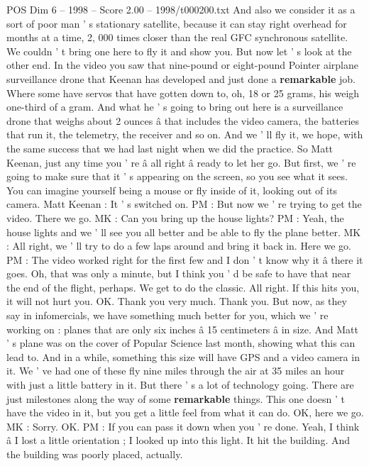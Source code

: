 \begin{textsample}{POS Dim 6 – 1998 – Score 2.00 – 1998/t000200.txt}
And also we consider it as a sort of poor man ' s stationary satellite, because it can stay right overhead for months at a time, 2, 000 times closer than the real GFC synchronous satellite.
We couldn ' t bring one here to fly it and show you.
But now let ' s look at the other end.
In the video you saw that nine-pound or eight-pound Pointer airplane surveillance drone that Keenan has developed and just done a \textbf{remarkable} job.
Where some have servos that have gotten down to, oh, 18 or 25 grams, his weigh one-third of a gram.
And what he ' s going to bring out here is a surveillance drone that weighs about 2 ounces â that includes the video camera, the batteries that run it, the telemetry, the receiver and so on.
And we ' ll fly it, we hope, with the same success that we had last night when we did the practice.
So Matt Keenan, just any time you ' re â all right â ready to let her go.
But first, we ' re going to make sure that it ' s appearing on the screen, so you see what it sees.
You can imagine yourself being a mouse or fly inside of it, looking out of its camera.
Matt Keenan : It ' s switched on.
PM : But now we ' re trying to get the video.
There we go.
MK : Can you bring up the house lights?
PM : Yeah, the house lights and we ' ll see you all better and be able to fly the plane better.
MK : All right, we ' ll try to do a few laps around and bring it back in.
Here we go.
PM : The video worked right for the first few and I don ' t know why it â there it goes.
Oh, that was only a minute, but I think you ' d be safe to have that near the end of the flight, perhaps.
We get to do the classic.
All right.
If this hits you, it will not hurt you.
OK.
Thank you very much.
Thank you.
But now, as they say in infomercials, we have something much better for you, which we ' re working on : planes that are only six inches â 15 centimeters â in size.
And Matt ' s plane was on the cover of Popular Science last month, showing what this can lead to.
And in a while, something this size will have GPS and a video camera in it.
We ' ve had one of these fly nine miles through the air at 35 miles an hour with just a little battery in it.
But there ' s a lot of technology going.
There are just milestones along the way of some \textbf{remarkable} things.
This one doesn ' t have the video in it, but you get a little feel from what it can do.
OK, here we go.
MK : Sorry.
OK.
PM : If you can pass it down when you ' re done.
Yeah, I think â I lost a little orientation ; I looked up into this light.
It hit the building.
And the building was poorly placed, actually.

\end{textsample}

